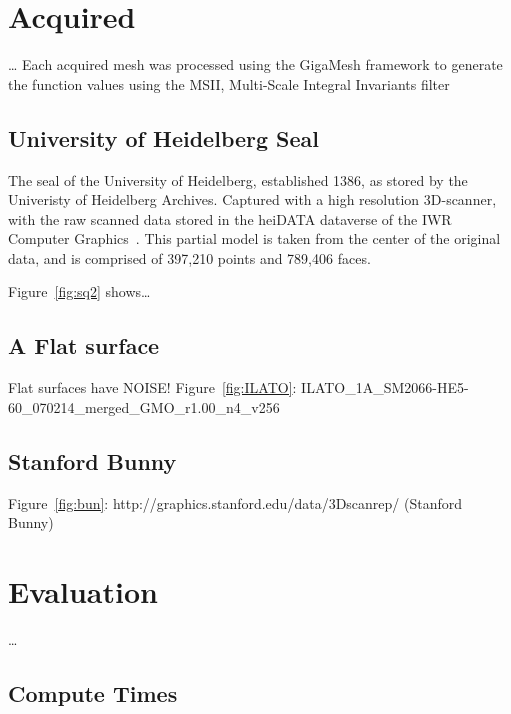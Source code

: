 %

%
%
%
%
%
%
\pagebreak
\section{Acquired \tdd{}}
\dots
Each acquired mesh was processed using the GigaMesh framework to generate the function values using the MSII, Multi-Scale Integral Invariants filter\todoCitation{}

%
%
%
%
\pagebreak
\subsection{University of Heidelberg Seal}
The seal of the University of Heidelberg, established 1386, as stored by the Univeristy of Heidelberg Archives. Captured with a high resolution 3D-scanner, with the raw scanned data stored in the heiDATA dataverse of the IWR Computer Graphics~\cite{Unisiegel}. This partial model is taken from the center of the original data, and is comprised of 397,210 points and 789,406 faces.


Figure~\ref{fig:sq2} shows\dots


%
%
%
%
\subsection{A Flat surface}
Flat surfaces have NOISE!
Figure~\ref{fig:ILATO}: ILATO\_1A\_SM2066-HE5-60\_070214\_merged\_GMO\_r1.00\_n4\_v256
%

%
%
%
%
\subsection{Stanford Bunny}
Figure~\ref{fig:bun}: http://graphics.stanford.edu/data/3Dscanrep/ (Stanford Bunny)
%

%
%
%
%
%
%
\section{Evaluation}
\ldots

%
%
%
%
\subsection{Compute Times}

